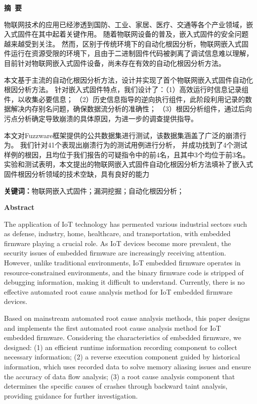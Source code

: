 \cleardoublepage{}
\begin{center}
    \bfseries {} 摘~要
\end{center}

物联网技术的应用已经渗透到国防、工业、家居、医疗、交通等各个产业领域，嵌入式固件在其中起着关键作用。
随着物联网设备的普及，嵌入式固件的安全问题越来越受到关注。
然而，区别于传统环境下的自动化根因分析，物联网嵌入式固件运行在资源受限的环境下，且由于二进制固件代码被剥离了调试信息难以理解，
目前针对物联网嵌入式固件设备，尚未存在有效的自动化根因分析方法。

本文基于主流的自动化根因分析方法，设计并实现了首个物联网嵌入式固件自动化根因分析方法。
针对嵌入式固件特点，我们设计了：（1）高效运行时信息记录组件，以收集必要信息；
（2）历史信息指导的逆向执行组件，此阶段利用记录的数据解决内存别名问题，确保数据流分析的准确性；
（3）根因分析组件，通过后向污点分析确定导致崩溃的具体原因，为进一步的调查提供指导。

本文对Fuzzware框架提供的公共数据集进行测试，该数据集涵盖了广泛的崩溃行为。
我们针对41个表现出崩溃行为的测试用例进行分析，
并成功找到了4个测试样例的根因，且均位于我们报告的可疑指令中的前4名，且其中3个均位于前3名。
实验和测试表明，本文提出的物联网嵌入式固件自动化根因分析方法填补了嵌入式固件根因分析领域的技术空缺，具有良好的能力


\textbf{关键词：}物联网嵌入式固件；漏洞挖掘；自动化根因分析；

\cleardoublepage{}
\begin{center}
    \bfseries {} Abstract
\end{center}

The application of IoT technology has permeated various industrial sectors such as defense, industry, home, healthcare, and transportation, with embedded firmware playing a crucial role. As IoT devices become more prevalent, the security issues of embedded firmware are increasingly receiving attention. However, unlike traditional environments, IoT embedded firmware operates in resource-constrained environments, and the binary firmware code is stripped of debugging information, making it difficult to understand. Currently, there is no effective automated root cause analysis method for IoT embedded firmware devices.

Based on mainstream automated root cause analysis methods, this paper designs and implements the first automated root cause analysis method for IoT embedded firmware. Considering the characteristics of embedded firmware, we designed: (1) an efficient runtime information recording component to collect necessary information; (2) a reverse execution component guided by historical information, which uses recorded data to solve memory aliasing issues and ensure the accuracy of data flow analysis; (3) a root cause analysis component that determines the specific causes of crashes through backward taint analysis, providing guidance for further investigation.

